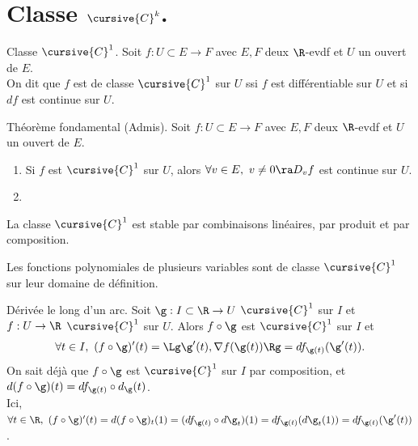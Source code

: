 \documentclass[11pt]{article}
\begin{document}
\section{Classe \texorpdfstring{$\cursive{C}^k$}{Lg}.}

\begin{defi}{Classe $\cursive{C}^1$.}{}
    Soit $f:U\subset E \to F$ avec $E,F$ deux $\R$-evdf et $U$ un ouvert de $E$.\\
    On dit que $f$ est de classe $\cursive{C}^1$ sur $U$ ssi $f$ est différentiable sur $U$ et si $df$ est continue sur $U$.
\end{defi}

\begin{thm}{Théorème fondamental (Admis).}{}
    Soit $f:U\subset E\to F$ avec $E,F$ deux $\R$-evdf et $U$ un ouvert de $E$.
    \begin{enumerate}
        \item Si $f$ est $\cursive{C}^1$ sur $U$, alors $\forall v \in E, ~ v\neq0 \ra D_vf$ est continue sur $U$.
        \item {}
    \end{enumerate}
\end{thm}

\begin{thm}{}{}
    La classe $\cursive{C}^1$ est stable par combinaisons linéaires, par produit et par composition.
\end{thm}

\begin{corr}{}{}
    Les fonctions polynomiales de plusieurs variables sont de classe $\cursive{C}^1$ sur leur domaine de définition.
\end{corr}

\begin{prop}{Dérivée le long d'un arc.}{}
    Soit $\g:I\subset\R\to U$ $\cursive{C}^1$ sur $I$ et $f:U\to\R$ $\cursive{C}^1$ sur $U$. Alors $f\circ \g$ est $\cursive{C}^1$ sur $I$ et
    \begin{equation*}
        \forall t \in I, ~ (f\circ \g)'(t) = \Lg \g'(t), \nabla f(\g(t)) \Rg = df_{\g(t)}(\g'(t)).
    \end{equation*}
    \tcblower
    On sait déjà que $f\circ \g$ est $\cursive{C}^1$ sur $I$ par composition, et $d(f\circ \g)(t)=df_{\g(t)}\circ d_{\g}(t)$.\\
    Ici, $\forall t \in \R, ~ (f\circ \g)'(t) = d(f\circ \g)_t(1) = (df_{\g(t)}\circ d\g_t)(1)=df_{\g(t)}(d\g_t(1))=df_{\g(t)}(\g'(t))$.
\end{prop}
\end{document}
